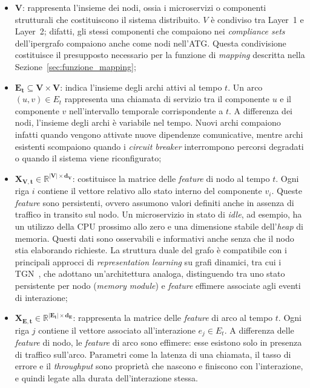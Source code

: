 \begin{itemize}
  \item $\mathbf{V}$: rappresenta l'insieme dei nodi, ossia i microservizi o componenti
        strutturali che costituiscono il sistema distribuito. $V$ è condiviso tra Layer~1 e
        Layer~2; difatti, gli stessi componenti che compaiono nei \textit{compliance sets}
        dell'ipergrafo compaiono anche come nodi nell'\gls{ATG}. Questa condivisione costituisce
        il presupposto necessario per la funzione di \textit{mapping} descritta nella
        Sezione~\ref{sec:funzione_mapping};
  \item $\mathbf{E_t \subseteq V \times V}$: indica l'insieme degli archi attivi al tempo $t$.
        Un arco $(u,v) \in E_t$ rappresenta una chiamata di servizio tra il componente $u$ e il
        componente $v$ nell'intervallo temporale corrispondente a $t$. A differenza dei nodi,
        l'insieme degli archi è variabile nel tempo. Nuovi archi compaiono infatti quando vengono
        attivate nuove dipendenze comunicative, mentre archi esistenti scompaiono quando i
        \textit{circuit breaker} interrompono percorsi degradati o quando il sistema viene
        riconfigurato;
  \item $\mathbf{X_{V,t} \in \mathbb{R}^{|V| \times d_V}}$: costituisce la matrice delle
        \textit{feature} di nodo al tempo $t$. Ogni riga $i$ contiene il vettore relativo allo
        stato interno del componente $v_i$. Queste \textit{feature} sono persistenti, ovvero
        assumono valori definiti anche in assenza di traffico in transito sul nodo. Un
        microservizio in stato di \textit{idle}, ad esempio, ha un utilizzo della \gls{CPU}
        prossimo allo zero e una dimensione stabile dell'\textit{heap} di memoria. Questi dati
        sono osservabili e informativi anche senza che il nodo stia elaborando richieste. La
        struttura duale del grafo è compatibile con i principali approcci di \textit{representation
        learning} su grafi dinamici, tra cui i \gls{TGN}~\cite{rossi2020}, che adottano
        un'architettura analoga, distinguendo tra uno stato persistente per nodo
        (\textit{memory module}) e \textit{feature} effimere associate agli eventi di interazione;
  \item $\mathbf{X_{E,t} \in \mathbb{R}^{|E_t| \times d_E}}$: rappresenta la matrice delle
        \textit{feature} di arco al tempo $t$. Ogni riga $j$ contiene il vettore associato
        all'interazione $e_j \in E_t$. A differenza delle \textit{feature} di nodo, le
        \textit{feature} di arco sono effimere: esse esistono solo in presenza di traffico
        sull'arco. Parametri come la latenza di una chiamata, il tasso di errore e il
        \textit{throughput} sono proprietà che nascono e finiscono con l'interazione, e quindi
        legate alla durata dell'interazione stessa.
\end{itemize}


